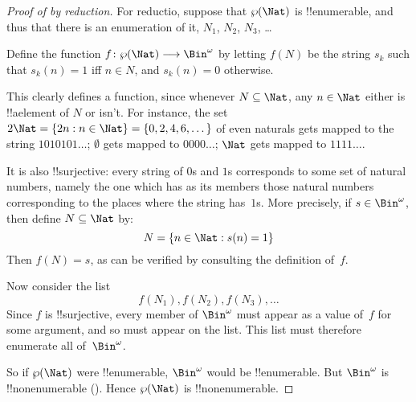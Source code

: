 \documentclass[../../../include/open-logic-section]{subfiles}
\begin{document}
\begin{proof}[Proof of {} by reduction]
For reductio, suppose that $\Pow{\Nat}$ is !!{enumerable}, and thus that
there is an enumeration of it, $N_{1}$, $N_{2}$, $N_{3}$, \dots

Define the function $f \colon \Pow{\Nat} \to \Bin^\omega$ by letting
$f(N)$ be the string $s_{k}$ such that $s_{k}(n) = 1$ iff $n \in N$,
and $s_k(n) = 0$ otherwise.  

This clearly defines a function, since whenever $N \subseteq \Nat$,
any $n \in \Nat$ either is !!a{element} of $N$ or isn't.  For
instance, the set $2\Nat = \Setabs{2n}{n \in \Nat} = \{0,2, 4, 6,
\dots\}$ of even naturals gets mapped to the string $1010101\dots$;
$\emptyset$ gets mapped to $0000\dots$; $\Nat$ gets mapped to
$1111\dots$.

It is also !!{surjective}: every string of $0$s and $1$s corresponds
to some set of natural numbers, namely the one which has as its
members those natural numbers  corresponding to the places where the string
has~$1$s. More precisely, if $s \in \Bin^\omega$, then define $N
\subseteq \Nat$ by:
\[
N = \Setabs{n \in \Nat}{s(n) = 1}
\]
Then $f(N) = s$, as can be verified by consulting the definition
of~$f$. 

Now consider the list
\[
f(N_1), f(N_2), f(N_3), \dots
\]
Since $f$ is !!{surjective}, every member of $\Bin^\omega$ must
appear as a value of~$f$ for some argument, and so must appear on the
list. This list must therefore enumerate all of~$\Bin^\omega$.

So if $\Pow{\Nat}$ were !!{enumerable}, $\Bin^\omega$ would be
!!{enumerable}.  But $\Bin^\omega$ is !!{nonenumerable}
(). Hence $\Pow{\Nat}$ is
!!{nonenumerable}.
\end{proof}

\end{document}

